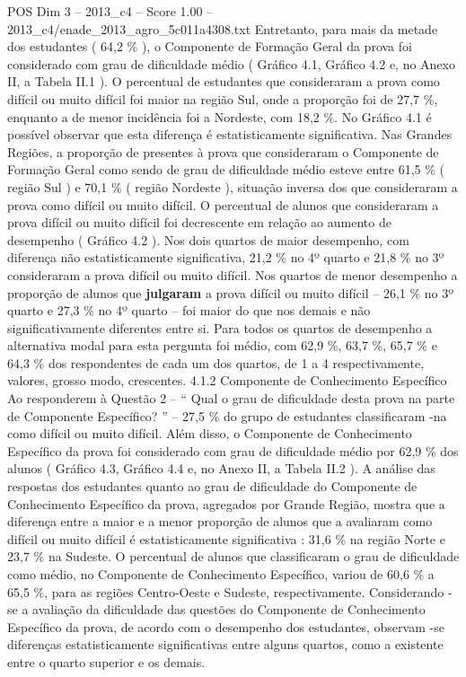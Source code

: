\begin{textsample}{POS Dim 3 – 2013\_c4 – Score 1.00 – 2013\_c4/enade\_2013\_agro\_5c011a4308.txt}
Entretanto, para mais da metade dos estudantes ( 64,2 \% ), o Componente de Formação Geral da prova foi considerado com grau de dificuldade médio ( Gráfico 4.1, Gráfico 4.2 e, no Anexo II, a Tabela II.1 ).
O percentual de estudantes que consideraram a prova como difícil ou muito difícil foi maior na região Sul, onde a proporção foi de 27,7 \%, enquanto a de menor incidência foi a Nordeste, com 18,2 \%.
No Gráfico 4.1 é possível observar que esta diferença é estatisticamente significativa.
Nas Grandes Regiões, a proporção de presentes à prova que consideraram o Componente de Formação Geral como sendo de grau de dificuldade médio esteve entre 61,5 \% ( região Sul ) e 70,1 \% ( região Nordeste ), situação inversa dos que consideraram a prova como difícil ou muito difícil.
O percentual de alunos que consideraram a prova difícil ou muito difícil foi decrescente em relação ao aumento de desempenho ( Gráfico 4.2 ).
Nos dois quartos de maior desempenho, com diferença não estatisticamente significativa, 21,2 \% no 4º quarto e 21,8 \% no 3º consideraram a prova difícil ou muito difícil.
Nos quartos de menor desempenho a proporção de alunos que \textbf{julgaram} a prova difícil ou muito difícil – 26,1 \% no 3º quarto e 27,3 \% no 4º quarto – foi maior do que nos demais e não significativamente diferentes entre si.
Para todos os quartos de desempenho a alternativa modal para esta pergunta foi médio, com 62,9 \%, 63,7 \%, 65,7 \% e 64,3 \% dos respondentes de cada um dos quartos, de 1 a 4 respectivamente, valores, grosso modo, crescentes. 4.1.2 Componente de Conhecimento Específico Ao responderem à Questão 2 – “ Qual o grau de dificuldade desta prova na parte de Componente Específico? ” – 27,5 \% do grupo de estudantes classificaram -na como difícil ou muito difícil.
Além disso, o Componente de Conhecimento Específico da prova foi considerado com grau de dificuldade médio por 62,9 \% dos alunos ( Gráfico 4.3, Gráfico 4.4 e, no Anexo II, a Tabela II.2 ).
A análise das respostas dos estudantes quanto ao grau de dificuldade do Componente de Conhecimento Específico da prova, agregados por Grande Região, mostra que a diferença entre a maior e a menor proporção de alunos que a avaliaram como difícil ou muito difícil é estatisticamente significativa : 31,6 \% na região Norte e 23,7 \% na Sudeste.
O percentual de alunos que classificaram o grau de dificuldade como médio, no Componente de Conhecimento Específico, variou de 60,6 \% a 65,5 \%, para as regiões Centro-Oeste e Sudeste, respectivamente.
Considerando -se a avaliação da dificuldade das questões do Componente de Conhecimento Específico da prova, de acordo com o desempenho dos estudantes, observam -se diferenças estatisticamente significativas entre alguns quartos, como a existente entre o quarto superior e os demais.

\end{textsample}
